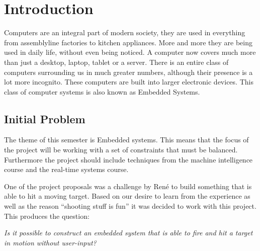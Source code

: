 \chapter{Introduction}

Computers are an integral part of modern society, they are used in everything
from assemblyline factories to kitchen appliances. More and more they are being
used in daily life, without even being noticed. A computer now covers much more
than just a desktop, laptop, tablet or a server. There is an entire class of
computers surrounding us in much greater numbers, although their presence is a
lot more incognito. These computers are built into larger electronic devices.
This class of computer systems is also known as Embedded Systems.

\section{Initial Problem}
The theme of this semester is Embedded systems. This means that the focus of
the project will be working with a set of constraints that must be balanced.
Furthermore the project should include techniques from the machine intelligence
course and the real-time systems course.\nl

One of the project proposals was a challenge by Ren\'e to build something that
is able to hit a moving target. Based on our desire to learn from the experience
as well as the reason ``shooting stuff is fun'' it was decided
to work with this project. This produces the question:\nl

\textit{Is it possible to construct an embedded system that is able to fire and hit
a target in motion without user-input?}
